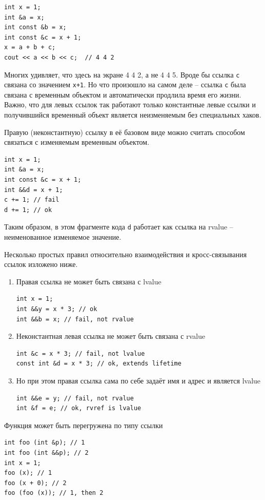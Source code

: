 \documentclass[a4paper,12pt,oneside]{book}
\begin{document}
\begin{lstlisting}
int x = 1;
int &a = x;
int const &b = x;
int const &c = x + 1;
x = a + b + c;
cout << a << b << c;  // 4 4 2
\end{lstlisting}

Многих удивляет, что здесь на экране 4 4 2, а не 4 4 5. Вроде бы ссылка \lstinline!c! связана со значением \lstinline!x+1!. Но что произошло на самом деле -- ссылка \lstinline!c! была связана с временным объектом и автоматически продлила время его жизни. Важно, что для левых ссылок так работают только константные левые ссылки и получившийся временный объект является неизменяемым без специальных хаков.

Правую (неконстантную) ссылку в её базовом виде можно считать способом связаться с изменяемым временным объектом.

\begin{lstlisting}
int x = 1;
int &a = x;
int const &c = x + 1;
int &&d = x + 1;
c += 1; // fail
d += 1; // ok
\end{lstlisting}

Таким образом, в этом фрагменте кода \lstinline!d! работает как ссылка на rvalue -- неименованное изменяемое значение.

Несколько простых правил относительно взаимодействия и кросс-связывания ссылок изложено ниже.

\begin{enumerate}
\item
Правая ссылка не может быть связана с lvalue
\begin{lstlisting}
int x = 1; 
int &&y = x * 3; // ok
int &&b = x; // fail, not rvalue 
\end{lstlisting}
\item
Неконстантная левая ссылка не может быть связана с rvalue
\begin{lstlisting}
int &c = x * 3; // fail, not lvalue
const int &d = x * 3; // ok, extends lifetime
\end{lstlisting}
\item
Но при этом правая ссылка сама по себе задаёт имя и адрес и является lvalue
\begin{lstlisting}
int &&e = y; // fail, not rvalue
int &f = e; // ok, rvref is lvalue
\end{lstlisting}
\end{enumerate}

Функция может быть перегружена по типу ссылки

\begin{lstlisting}
int foo (int &p); // 1
int foo (int &&p); // 2
int x = 1;
foo (x); // 1
foo (x + 0); // 2
foo (foo (x)); // 1, then 2
\end{lstlisting}
\end{document}
